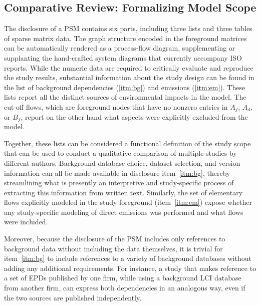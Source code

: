

\subsection{Comparative Review: Formalizing Model Scope}

The disclosure of a PSM contains six parts, including three lists and three tables of sparse matrix data.  The graph structure encoded in the foreground matrices can be automatically rendered as a process-flow diagram, supplementing or supplanting the hand-crafted system diagrams that currently accompany ISO reports. While the numeric data are required to critically evaluate and reproduce the study results, substantial information about the study design can be found in the list of background dependencies (\ref{itm:bg}) and emissions (\ref{itm:em}).  These lists report all the distinct sources of environmental impacts in the model.  The cut-off flows, which are foreground nodes that have no nonzero entries in $A_f$, $A_d$, or $B_f$, report on the other hand what aspects were explicitly excluded from the model.

Together, these lists can be considered a functional definition of the study scope that can be used to conduct a qualitative comparison of multiple studies by different authors.  Background database choice, dataset selection, and version information can all be made available in disclosure item~\ref{itm:bg}, thereby streamlining what is presently an interpretive and study-specific process of extracting this information from written text.  Similarly, the set of elementary flows explicitly modeled in the study foreground (item~\ref{itm:em}) expose whether any study-specific modeling of direct emissions was performed and what flows were included.

Moreover, because the disclosure of the PSM includes only references to background data without including the data themselves, it is trivial for item~\ref{itm:bg} to include references to a variety of background databases without adding any additional requirements.  For instance, a study that makes reference to a set of EPDs published by one firm, while using a background LCI database from another firm, can express both dependencies in an analogous way, even if the two sources are published independently.  



